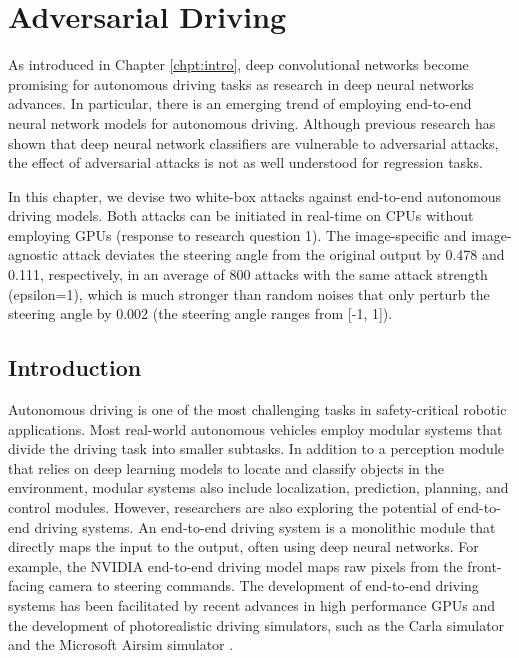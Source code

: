 \chapter{Adversarial Driving}
\label{chpt:driving}


As introduced in Chapter \ref{chpt:intro}, deep convolutional networks become promising for autonomous driving tasks as research in deep neural networks advances. In particular, there is an emerging trend of employing end-to-end neural network models for autonomous driving. Although previous research has shown that deep neural network classifiers are vulnerable to adversarial attacks, the effect of adversarial attacks is not as well understood for regression tasks. 

In this chapter, we devise two white-box attacks against end-to-end autonomous driving models. Both attacks can be initiated in real-time on CPUs without employing GPUs (response to research question 1). The image-specific and image-agnostic attack deviates the steering angle from the original output by 0.478 and 0.111, respectively, in an average of 800 attacks with the same attack strength (epsilon=1), which is much stronger than random noises that only perturb the steering angle by 0.002 (the steering angle ranges from [-1, 1]). 




\section{Introduction}

Autonomous driving is one of the most challenging tasks in safety-critical robotic applications. Most real-world autonomous vehicles employ modular systems that divide the driving task into smaller subtasks. In addition to a perception module that relies on deep learning models to locate and classify objects in the environment, modular systems also include localization, prediction, planning, and control modules. However, researchers are also exploring the potential of end-to-end driving systems. An end-to-end driving system is a monolithic module that directly maps the input to the output, often using deep neural networks. For example, the NVIDIA end-to-end driving model \citep{bojarski2016end} maps raw pixels from the front-facing camera to steering commands. The development of end-to-end driving systems has been facilitated by recent advances in high performance GPUs and the development of photorealistic driving simulators, such as the Carla simulator \citep{Dosovitskiy17} and the Microsoft Airsim simulator \citep{airsim2017fsr}.  

